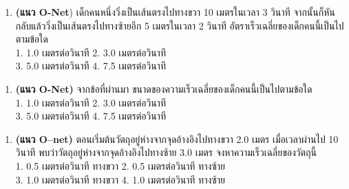 \documentclass[a4paper,12pt,twoside]{article}
\begin{document}
\begin{center}\end{center}

\begin{enumerate}[resume]
	\item {} \textbf{(แนว O-Net})  เด็กคนหนึ่งวิ่งเป็นเส้นตรงไปทางขวา  10  เมตรในเวลา  3  วินาที   จากนั้นก็หันกลับแล้ววิ่งเป็นเส้นตรงไปทางซ้ายอีก   5  เมตรในเวลา   2  วินาที   อัตราเร็วเฉลี่ยของเด็กคนนี้เป็นไปตามข้อใด \\
		1.  1.0  เมตรต่อวินาที	\hfill							2.  3.0  เมตรต่อวินาที \hfill\phantom{xx}\\
		3.  5.0  เมตรต่อวินาที	\hfill							4.  7.5  เมตรต่อวินาที \hfill\phantom{xx}
\vspace{0.8in}
\end{enumerate}
\begin{enumerate}[resume]
	\item {} \textbf{(แนว O-Net)}  จากข้อที่ผ่านมา  ขนาดของความเร็วเฉลี่ยของเด็กคนนี้เป็นไปตามข้อใด  \\
		1.  1.0  เมตรต่อวินาที	\hfill							2.  3.0  เมตรต่อวินาที \hfill\phantom{xx}\\
		3.  5.0  เมตรต่อวินาที	\hfill							4.  7.5  เมตรต่อวินาที \hfill\phantom{xx}
\vspace{0.8in}
\end{enumerate}

\newpage

\begin{enumerate}[resume]
	\item \textbf{(แนว O–net)}  ตอนเริ่มต้นวัตถุอยู่ห่างจากจุดอ้างอิงไปทางขวา  2.0  เมตร   เมื่อเวลาผ่านไป  10  	วินาที   พบว่าวัตถุอยู่ห่างจากจุดอ้างอิงไปทางซ้าย   3.0  เมตร  จงหาความเร็วเฉลี่ยของวัตถุนี้ \\
 		 1.  0.5  เมตรต่อวินาที 	 ทางขวา	\hfill	 			2.  0.5  เมตรต่อวินาที  ทางซ้าย \hfill\phantom{xx}\\
 		 3.  1.0  เมตรต่อวินาที 	 ทางขวา	\hfill	  			4.  1.0  เมตรต่อวินาที  ทางซ้าย \hfill\phantom{xx}
\vspace{0.8in}
\end{enumerate}
\end{document}
